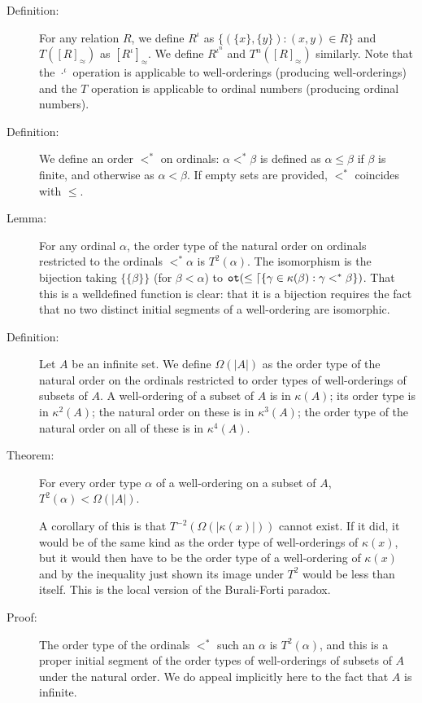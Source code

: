 \documentclass[12pt]{article}
\begin{document}
\begin{description}
\item[Definition:]  For any relation $R$, we define $R^{\iota}$ as $\{(\{x\},\{y\}):(x,y) \in R\}$ and $T([R]_\approx)$ as $[R^\iota]_\approx$.   We define $R^{\iota^n}$ and $T^n([R]_\approx)$ similarly.  Note that the $\cdot^\iota$ operation is applicable to well-orderings (producing well-orderings) and the $T$ operation is applicable to ordinal numbers (producing ordinal numbers).

\item[Definition:]  We define an order $<^*$ on ordinals:  $\alpha <^* \beta$ is defined as $\alpha\leq \beta$ if $\beta$ is finite, and otherwise as $\alpha<\beta$.  If empty sets are provided, $<^*$ coincides with $\leq$.

\item[Lemma:]  For any ordinal $\alpha$, the order type of the natural order on ordinals restricted to the ordinals $<^* \alpha$ is $T^2(\alpha)$.  The isomorphism is the bijection taking $\{\{\beta\}\}$ (for $\beta<\alpha$) to ${\tt ot}(\leq\lceil\{\gamma\in \kappa(\beta):\gamma <^* \beta\})$.  That this is a welldefined function is clear:  that it is a bijection requires the fact that no two distinct initial segments of a well-ordering are isomorphic.

\item[Definition:]  Let $A$ be an infinite set.  We define $\Omega(|A|)$ as the order type of the natural order on the ordinals restricted to order types of well-orderings of subsets of $A$.  A well-ordering of a subset of $A$ is in $\kappa(A)$;  its order type is in $\kappa^2(A)$;  the natural order on these is in $\kappa^3(A)$;  the order type of the natural order on all of these is in $\kappa^4(A)$.

\item[Theorem:]  For every order type $\alpha$ of a well-ordering on a subset of $A$, $T^2(\alpha) < \Omega(|A|)$.  

A corollary of this is that $T^{-2}(\Omega(|\kappa(x)|))$ cannot exist.  If it did, it would be of the same kind as the order type of well-orderings of $\kappa(x)$, but it would then have to be the order type of a well-ordering of $\kappa(x)$
and by the inequality just shown its image under $T^2$ would be less than itself.  This is the local version of the Burali-Forti paradox.

\item[Proof:]  The order type of the ordinals $<^*$ such an $\alpha$ is $T^2(\alpha)$, and this is a proper initial segment of the order types of well-orderings of subsets of $A$ under the natural order.  We do appeal implicitly here to the fact that $A$ is infinite.


\end{description}
\end{document}
